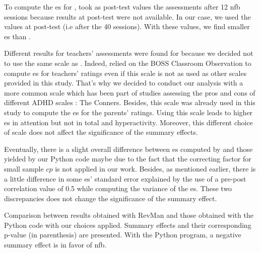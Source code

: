 \begin{description}
    \item To compute the \gls{es} for \citet{Arnold2014}, \citet{Cortese2016} took as post-test values the assessments after 12 \gls{nfb} sessions
		because results at post-test were not available. In our case, we used the values at post-test (i.e after the 40 sessions). With these values, 
		we find smaller \gls{es} than \citet{Cortese2016}.  
    \item Different results for teachers' assessments were found for \cite{Steiner2014} because we decided not to use the same scale 
		as \citet{Cortese2016}. Indeed, \citet{Cortese2016} relied on the BOSS Classroom Observation \citep{Shapiro2010} to compute \gls{es}
		for teachers' ratings even if this scale is not as used as other scales provided in this study. That's why we decided to conduct our analysis
		with a more common scale which has been part of studies assessing the pros and cons of different ADHD scales \citep{Epstein2012, Collett2003}: The Conners. 
		Besides, this scale was already used in this study to compute the \gls{es} for the parents' ratings. 
		Using this scale leads to higher \gls{es} in attention but not in total and hyperactivity. Moreover, this different choice of 
		scale does not affect the significance of the summary effects.
		\item Eventually, there is a slight overall difference between \gls{es} computed by \citet{Cortese2016} and those yielded by our Python 
		code maybe due to the fact that the correcting factor for small sample $cp$ is not applied in our work. Besides, as mentioned earlier, 
		there is a little difference in some \gls{es}' standard error explained by the use of a pre-post correlation value  of 0.5 
		while computing the variance of the \gls{es}. These two discrepancies does not change the significance of the summary effect.
\end{description}

\begin{table}[h!]
  \centering
  \caption{Comparison between \citet{Cortese2016} results obtained with RevMan \citep{RevMan} and those obtained with the Python code with our 
	choices applied. Summary effects and their corresponding p-value (in parenthesis) are presented. With the Python program, a negative summary 
	effect is in favor of \gls{nfb}.}

  \label{Table:meta_review_comparison_revman_and_python_with_choices}
\end{table}

